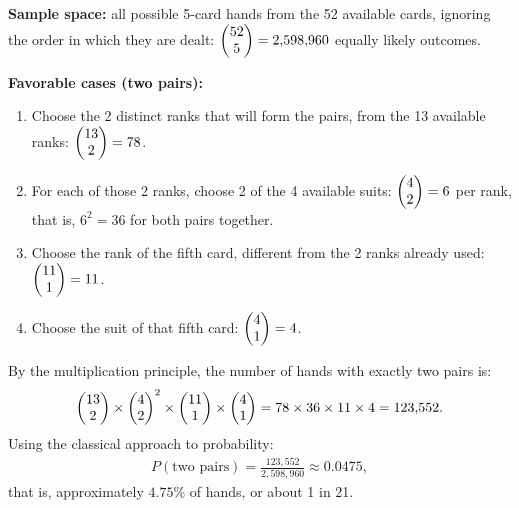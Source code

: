 \begin{solproblema}[prob:b53268b]
	\textbf{Sample space:} all possible 5-card hands from the 52 available cards, ignoring the order in which they are dealt: $\begin{pmatrix} 52 \\ 5\end{pmatrix} = 2{,}598{,}960$ equally likely outcomes.

	\textbf{Favorable cases (two pairs):}
	\begin{enumerate}
		\item Choose the 2 distinct ranks that will form the pairs, from the 13 available ranks: $\begin{pmatrix} 13 \\ 2\end{pmatrix} = 78$.
		\item For each of those 2 ranks, choose 2 of the 4 available suits: $\begin{pmatrix} 4 \\ 2\end{pmatrix} = 6$ per rank, that is, $6^2 = 36$ for both pairs together.
		\item Choose the rank of the fifth card, different from the 2 ranks already used: $\begin{pmatrix} 11 \\ 1\end{pmatrix} = 11$.
		\item Choose the suit of that fifth card: $\begin{pmatrix} 4 \\ 1\end{pmatrix} = 4$.
	\end{enumerate}
	By the multiplication principle, the number of hands with exactly two pairs is:
	\begin{align}
		\begin{pmatrix} 13 \\ 2\end{pmatrix} \times \begin{pmatrix} 4 \\ 2\end{pmatrix}^2 \times \begin{pmatrix} 11 \\ 1\end{pmatrix} \times \begin{pmatrix} 4 \\ 1\end{pmatrix} = 78 \times 36 \times 11 \times 4 = 123{,}552.
	\end{align}
	Using the classical approach to probability:
	\begin{align}
		P(\text{two pairs}) = \frac{123{,}552}{2{,}598{,}960} \approx 0.0475,
	\end{align}
	that is, approximately $4.75\%$ of hands, or about 1 in 21.
\end{solproblema}
